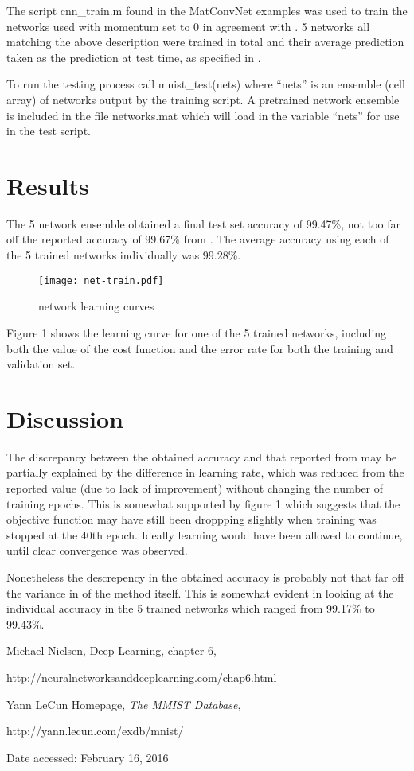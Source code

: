 \documentclass[a4paper,12pt]{article}
\begin{document}
The script cnn\_train.m found in the MatConvNet examples was used to train the networks used with momentum set to 0 in agreement with \cite{SRC}. 5 networks all matching the above description were trained in total and their average prediction taken as the prediction at test time, as specified in \cite{SRC}.

To run the testing process call mnist\_test(nets) where ``nets'' is an ensemble (cell array) of networks output by the training script. A pretrained network ensemble is included in the file networks.mat which will load in the variable ``nets''  for use in the test script.

\section{Results}
The 5 network ensemble obtained a final test set accuracy of 99.47\%, not too far off the reported accuracy of 99.67\% from \cite{SRC}. 
The average accuracy using each of the 5 trained networks individually was 99.28\%.
\begin{figure}[!ht]
  \caption{network learning curves}
  \centering
    \texttt{[image: net-train.pdf]}
\end{figure}

Figure 1 shows the learning curve for one of the 5 trained networks, including both the value of the cost function and the error rate for both the training and validation set.



\section{Discussion}
The discrepancy between the obtained accuracy and that reported from \cite{SRC} may be partially explained by the difference in learning rate, which was reduced from the reported value (due to lack of improvement) without changing the number of training epochs. This is somewhat supported by figure 1 which suggests that the objective function may have still been droppping slightly when training was stopped at the 40th epoch. Ideally learning would have been allowed to continue, until clear convergence was observed. 

Nonetheless the descrepency in the obtained accuracy is probably not that far off the variance in of the method itself. This is somewhat evident in looking at the individual accuracy in the 5 trained networks which ranged from 99.17\% to 99.43\%.


\begin{thebibliography}{10}

Michael Nielsen, Deep Learning, chapter 6,

http://neuralnetworksanddeeplearning.com/chap6.html

Yann LeCun Homepage, \textit{The MMIST Database},

http://yann.lecun.com/exdb/mnist/

Date accessed: February 16, 2016




\end{thebibliography}
\end{document}
